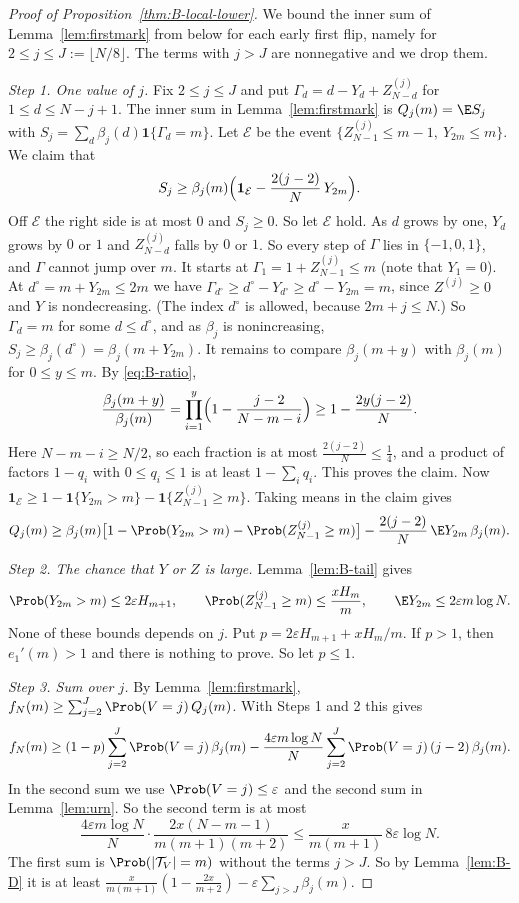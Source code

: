 \begin{proof}[Proof of Proposition~\ref{thm:B-local-lower}]
We bound the inner sum of Lemma~\ref{lem:firstmark} from below for each
early first flip, namely for $2\le j\le J:=\lfloor N/8\rfloor$. The terms
with $j>J$ are nonnegative and we drop them.

\emph{Step 1. One value of $j$.} Fix $2\le j\le J$ and put
$\Gamma_d=d-Y_d+Z^{(j)}_{N-d}$ for $1\le d\le N-j+1$. The inner sum in
Lemma~\ref{lem:firstmark} is $Q_j(m)=\E S_j$ with
$S_j=\sum_d\beta_j(d)\mathbf 1\{\Gamma_d=m\}$. Let $\mathcal E$ be the event
$\{Z^{(j)}_{N-1}\le m-1,\ Y_{2m}\le m\}$. We claim that
\[
 S_j\ge\beta_j(m)\Bigl(\mathbf 1_{\mathcal E}-\frac{2(j-2)}N\,Y_{2m}\Bigr).
\]
Off $\mathcal E$ the right side is at most $0$ and $S_j\ge0$. So let
$\mathcal E$ hold. As $d$ grows by one, $Y_d$ grows by $0$ or $1$ and
$Z^{(j)}_{N-d}$ falls by $0$ or $1$. So every step of $\Gamma$ lies in
$\{-1,0,1\}$, and $\Gamma$ cannot jump over $m$. It starts at
$\Gamma_1=1+Z^{(j)}_{N-1}\le m$ (note that $Y_1=0$). At
$d^\circ=m+Y_{2m}\le2m$ we have
$\Gamma_{d^\circ}\ge d^\circ-Y_{d^\circ}\ge d^\circ-Y_{2m}=m$, since
$Z^{(j)}\ge0$ and $Y$ is nondecreasing. (The index $d^\circ$ is allowed,
because $2m+j\le N$.) So $\Gamma_d=m$ for some $d\le d^\circ$, and as
$\beta_j$ is nonincreasing, $S_j\ge\beta_j(d^\circ)=\beta_j(m+Y_{2m})$. It
remains to compare $\beta_j(m+y)$ with $\beta_j(m)$ for $0\le y\le m$. By
\eqref{eq:B-ratio},
\[
 \frac{\beta_j(m+y)}{\beta_j(m)}=\prod_{i=1}^y\Bigl(1-\frac{j-2}{N-m-i}\Bigr)
 \ge1-\frac{2y(j-2)}N .
\]
Here $N-m-i\ge N/2$, so each fraction is at most
$\frac{2(j-2)}N\le\frac14$, and a product of factors $1-q_i$ with
$0\le q_i\le1$ is at least $1-\sum_iq_i$. This proves the claim. Now
$\mathbf 1_{\mathcal E}\ge1-\mathbf 1\{Y_{2m}>m\}-\mathbf 1\{Z^{(j)}_{N-1}\ge m\}$.
Taking means in the claim gives
\[
 Q_j(m)\ge\beta_j(m)\bigl[1-\Prob(Y_{2m}>m)-\Prob(Z^{(j)}_{N-1}\ge m)\bigr]
 -\frac{2(j-2)}N\,\E Y_{2m}\,\beta_j(m).
\]

\emph{Step 2. The chance that $Y$ or $Z$ is large.} Lemma~\ref{lem:B-tail}
gives
\[
 \Prob(Y_{2m}>m)\le2\varepsilon H_{m+1},\qquad
 \Prob(Z^{(j)}_{N-1}\ge m)\le\frac{xH_m}m,\qquad
 \E Y_{2m}\le2\varepsilon m\log N .
\]
None of these bounds depends on $j$. Put $p=2\varepsilon H_{m+1}+xH_m/m$.
If $p>1$, then $e_1'(m)>1$ and there is nothing to prove. So let
$p\le1$.

\emph{Step 3. Sum over $j$.} By Lemma~\ref{lem:firstmark},
$f_N(m)\ge\sum_{j=2}^J\Prob(V=j)\,Q_j(m)$. With Steps 1 and 2 this gives
\[
 f_N(m)\ge(1-p)\sum_{j=2}^J\Prob(V=j)\,\beta_j(m)
 -\frac{4\varepsilon m\log N}N\sum_{j=2}^J\Prob(V=j)\,(j-2)\,\beta_j(m).
\]
In the second sum we use $\Prob(V=j)\le\varepsilon$ and the second sum in
Lemma~\ref{lem:urn}. So the second term is at most
\[
 \frac{4\varepsilon m\log N}N\cdot\frac{2x(N-m-1)}{m(m+1)(m+2)}
 \le\frac{x}{m(m+1)}\,8\varepsilon\log N .
\]
The first sum is $\Prob(\lvert\mathcal T_V\rvert=m)$ without the terms $j>J$. So by
Lemma~\ref{lem:B-D} it is at least
$\frac{x}{m(m+1)}(1-\frac{2x}{m+2})-\varepsilon\sum_{j>J}\beta_j(m)$.


\end{proof}
